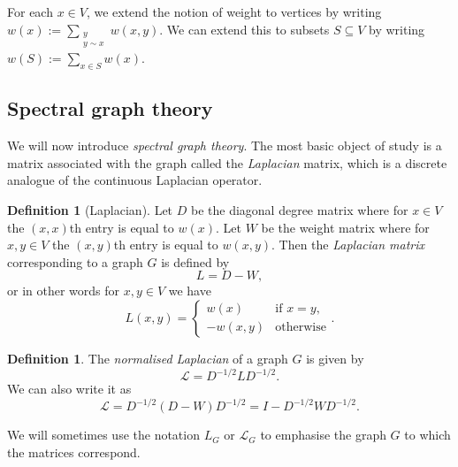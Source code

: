 \documentclass[a4paper,11pt]{article}
\theoremstyle{definition}
\newtheorem{definition}[theorem]{Definition}
\newtheorem{example}[theorem]{Example}
\renewcommand{\L}{\mathcal{L}}
\begin{document}
For each $x \in V$, we extend the notion of weight to vertices by writing $w(x) := \sum\limits_{\substack{y \\ y \sim x}} w(x, y)$. We can extend this to subsets $S \subseteq V$ by writing $w(S) := \sum_{x \in S} w(x)$.

\subsection{Spectral graph theory}
We will now introduce \emph{spectral graph theory}. The most basic object of study is a matrix associated with the graph called the \emph{Laplacian} matrix, which is a discrete analogue of the continuous Laplacian operator.
\begin{definition}[Laplacian]
Let $D$ be the diagonal degree matrix where for $x \in V$ the $(x, x)$th entry is equal to $w(x)$. Let $W$ be the weight matrix where for $x, y \in V$ the $(x, y)$th entry is equal to $w(x, y)$. Then the \emph{Laplacian matrix} corresponding to a graph $G$ is defined by
\[L = D - W,\] or in other words for $x, y \in V$ we have \[L(x, y) = \begin{cases}w(x) & \text{if } x = y,\\-w(x, y) & \text{otherwise}\end{cases}.\]
\end{definition}
\begin{definition}\label{spectrum}
The \emph{normalised Laplacian} of a graph $G$ is given by \[\L = D^{-1/2} L D^{-1/2}.\] We can also write it as \[\L = D^{-1/2} (D - W) D^{-1/2} = I - D^{-1/2}WD^{-1/2}.\]
\end{definition}
We will sometimes use the notation $L_G$ or $\L_G$ to emphasise the graph $G$ to which the matrices correspond.

\end{document}
